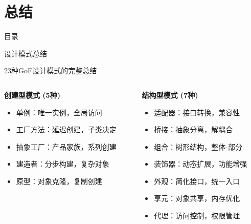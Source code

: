 \documentclass[UTF8,aspectratio=169]{beamer}
\begin{document}
\section{总结}
\begin{frame}{目录}
    \begin{multicols}{2}
    \end{multicols}
\end{frame}

\begin{frame}{设计模式总结}
    \begin{ytublock}{23种GoF设计模式的完整总结}
        \begin{columns}
            \begin{column}{0.5\textwidth}
                \textbf{创建型模式 (5种)}
                \begin{itemize}
                    \item 单例：唯一实例，全局访问
                    \item 工厂方法：延迟创建，子类决定
                    \item 抽象工厂：产品家族，系列创建
                    \item 建造者：分步构建，复杂对象
                    \item 原型：对象克隆，复制创建
                \end{itemize}
            \end{column}
            \begin{column}{0.5\textwidth}
                \textbf{结构型模式 (7种)}
                \begin{itemize}
                    \item 适配器：接口转换，兼容性
                    \item 桥接：抽象分离，解耦合
                    \item 组合：树形结构，整体-部分
                    \item 装饰器：动态扩展，功能增强
                    \item 外观：简化接口，统一入口
                    \item 享元：对象共享，内存优化
                    \item 代理：访问控制，权限管理
                \end{itemize}
            \end{column}
        \end{columns}
    \end{ytublock}
\end{frame}
\end{document}
